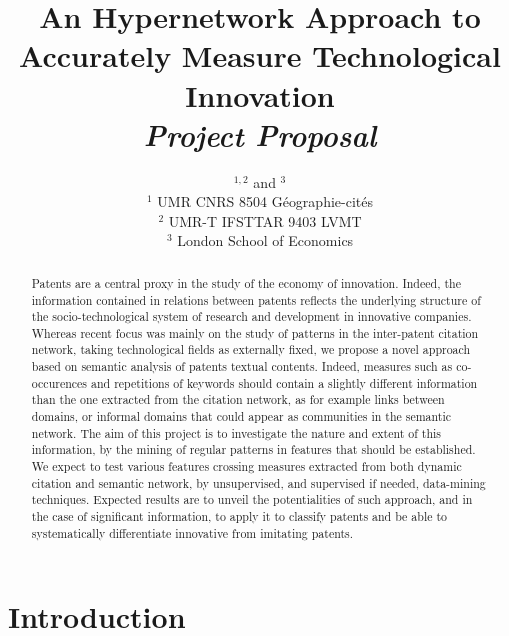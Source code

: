 


\title{
An Hypernetwork Approach to Accurately Measure Technological Innovation
\bigskip\\
\textit{Project Proposal}
}
\author{$^{1,2}$ and $^{3}$\medskip\\
$^{1}$ UMR CNRS 8504 G{\'e}ographie-cit{\'e}s\\
$^{2}$ UMR-T IFSTTAR 9403 LVMT\\
$^{3}$ London School of Economics
}
\date{}


\maketitle

\justify


\begin{abstract}
Patents are a central proxy in the study of the economy of innovation. Indeed, the information contained in relations between patents reflects the underlying structure of the socio-technological system of research and development in innovative companies. Whereas recent focus was mainly on the study of patterns in the inter-patent citation network, taking technological fields as externally fixed, we propose a novel approach based on semantic analysis of patents textual contents. Indeed, measures such as co-occurences and repetitions of keywords should contain a slightly different information than the one extracted from the citation network, as for example links between domains, or informal domains that could appear as communities in the semantic network. The aim of this project is to investigate the nature and extent of this information, by the mining of regular patterns in features that should be established. We expect to test various features crossing measures extracted from both dynamic citation and semantic network, by unsupervised, and supervised if needed, data-mining techniques. Expected results are to unveil the potentialities of such approach, and in the case of significant information, to apply it to classify patents and be able to systematically differentiate innovative from imitating patents.
\end{abstract}


\section{Introduction}

